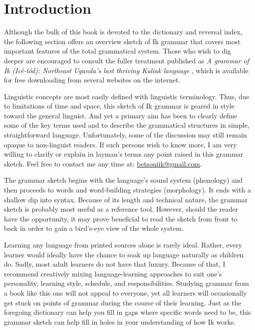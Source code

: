 \setcounter{section}{0}
\section{Introduction}\label{sec:1}


Although the bulk of this book is devoted to the dictionary and reversal index, the following section offers an overview sketch of Ik grammar that covers most important features of the total grammatical system. Those who wish to dig deeper are encouraged to consult the fuller treatment published as \textit{A grammar of Ik (Icé-tód): Northeast Uganda’s last thriving Kuliak language} \citep{Schrock2014}, which is available for free downloading from several websites on the internet. 

Linguistic concepts are most easily defined with linguistic terminology. Thus, due to limitations of time and space, this sketch of Ik grammar is geared in style toward the general linguist. And yet a primary aim has been to clearly define some of the key terms used and to describe the grammatical structures in simple, straightforward language. Unfortunately, some of the discussion may still remain opaque to non-linguist readers. If such persons wish to know more, I am very willing to clarify or explain in layman’s terms any point raised in this grammar sketch. Feel free to contact me any time at: \href{mailto:betsoniik@gmail.com}{betsoniik@gmail.com}.

The grammar sketch begins with the language’s sound system (phonology) and then proceeds to words and word-building strategies (morphology). It ends with a shallow dip into syntax. Because of its length and technical nature, the grammar sketch is probably most useful as a reference tool. However, should the reader have the opportunity, it may prove beneficial to read the sketch from front to back in order to gain a bird’s-eye view of the whole system.

Learning any language from printed sources alone is rarely ideal. Rather, every learner would ideally have the chance to soak up language naturally as children do. Sadly, most adult learners do not have that luxury. Because of that, I recommend creatively mixing language-learning approaches to suit one’s personality, learning style, schedule, and responsibilities. Studying grammar from a book like this one will not appeal to everyone, yet all learners will occasionally get stuck on points of grammar during the course of their learning. Just as the foregoing dictionary can help you fill in gaps where specific words need to be, this grammar sketch can help fill in holes in your understanding of how Ik works.